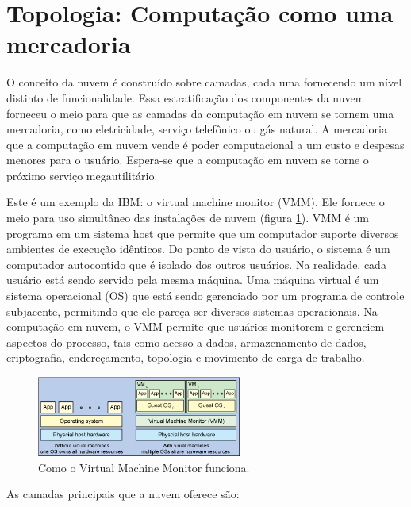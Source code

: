 \section{Topologia: Computação como uma mercadoria}

O conceito da nuvem é construído sobre camadas, cada uma fornecendo um nível
distinto de funcionalidade. Essa estratificação dos componentes da nuvem forneceu o
meio para que as camadas da computação em nuvem se tornem uma mercadoria, como
eletricidade, serviço telefônico ou gás natural. A mercadoria que a computação em
nuvem vende é poder computacional a um custo e despesas menores para o usuário.
Espera-se que a computação em nuvem se torne o próximo serviço megautilitário.

Este é um exemplo da IBM: o virtual machine monitor (VMM). Ele fornece o meio para
uso simultâneo das instalações de nuvem (figura \ref{fig:vmm}). VMM é um programa em
um sistema host que permite que um computador suporte diversos ambientes de execução
idênticos. Do ponto de vista do usuário, o sistema é um computador autocontido que
é isolado dos outros usuários. Na realidade, cada usuário está sendo servido pela
mesma máquina. Uma máquina virtual é um sistema operacional (OS) que está sendo
gerenciado por um programa de controle subjacente, permitindo que ele pareça ser
diversos sistemas operacionais. Na computação em nuvem, o VMM permite que usuários
monitorem e gerenciem aspectos do processo, tais como acesso a dados, armazenamento
de dados, criptografia, endereçamento, topologia e movimento de carga de trabalho. 


\begin{figure}[ht]
    \centering
    \includegraphics[width=0.6\textwidth]{img/vmm.png}
    \caption{Como o Virtual Machine Monitor funciona.}
    \label{fig:vmm}
\end{figure}


As camadas principais que a nuvem oferece são:

\newcommand{\itemm}[1]{\item\textbf{#1}}

